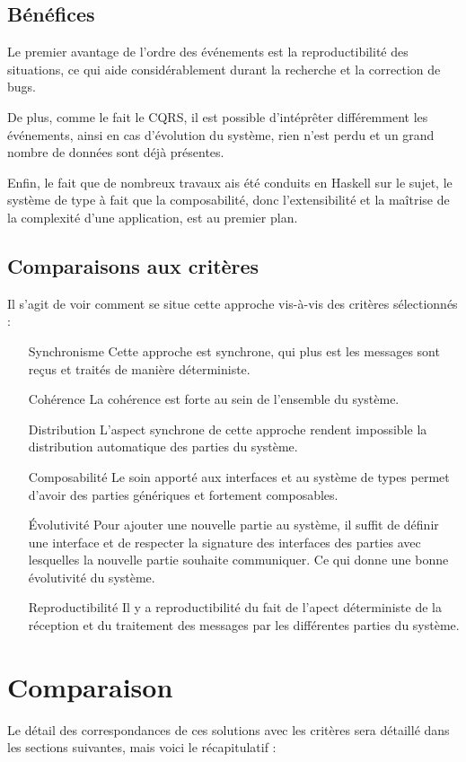 \documentclass{article}
\begin{document}
\subsection{Bénéfices}\label{bénéfices-1}

Le premier avantage de l'ordre des événements est la reproductibilité
des situations, ce qui aide considérablement durant la recherche et la
correction de bugs.

De plus, comme le fait le CQRS, il est possible d'intéprêter différemment
les événements, ainsi en cas d'évolution du système, rien n'est perdu et
un grand nombre de données sont déjà présentes.

Enfin, le fait que de nombreux travaux ais été conduits en Haskell sur
le sujet, le système de type à fait que la composabilité, donc
l'extensibilité et la maîtrise de la complexité d'une application, est
au premier plan.

\subsection{Comparaisons aux critères}
Il s'agit de voir comment se situe cette approche vis-à-vis des critères sélectionnés :

\begin{itemize}
    \item[Synchronisme] Cette approche est synchrone, qui plus est les messages
sont reçus et traités de manière déterministe.
    \item[Cohérence] La cohérence est forte au sein de l'ensemble du système.
    \item[Distribution] L'aspect synchrone de cette approche rendent impossible la distribution  
automatique des parties du système.
    \item[Composabilité] Le soin apporté aux interfaces et au système de types
permet d'avoir des parties génériques et fortement composables.
    \item[Évolutivité] Pour ajouter une nouvelle partie au système, il suffit de
définir une interface et de respecter la signature des interfaces des parties
avec lesquelles la nouvelle partie souhaite communiquer. Ce qui donne une bonne
évolutivité du système.
    \item[Reproductibilité] Il y a reproductibilité du fait de l'apect déterministe
de la réception et du traitement des messages par les différentes parties du système.
\end{itemize}

\section{Comparaison}
Le détail des correspondances de ces solutions avec les critères sera détaillé
dans les sections suivantes, mais voici le récapitulatif :
\end{document}
